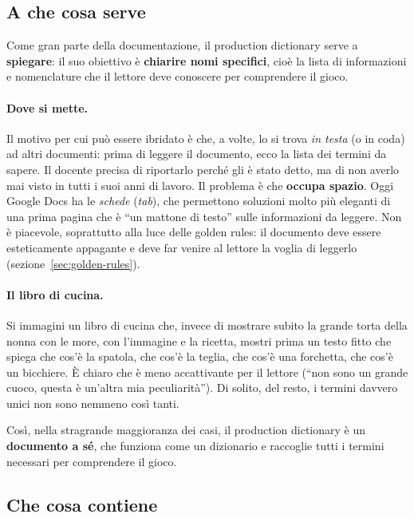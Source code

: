 \subsection{A che cosa serve}

Come gran parte della documentazione, il production dictionary serve a
\textbf{spiegare}: il suo obiettivo è \textbf{chiarire nomi specifici}, cioè
la lista di informazioni e nomenclature che il lettore deve conoscere per
comprendere il gioco.

\paragraph{Dove si mette.} Il motivo per cui può essere ibridato è che, a
volte, lo si trova \emph{in testa} (o in coda) ad altri documenti: prima di
leggere il documento, ecco la lista dei termini da sapere. Il docente precisa
di riportarlo perché gli è stato detto, ma di non averlo mai visto in tutti i
suoi anni di lavoro. Il problema è che \textbf{occupa spazio}. Oggi Google
Docs ha le \emph{schede} (\emph{tab}), che permettono soluzioni molto più
eleganti di una prima pagina che è ``un mattone di testo'' sulle informazioni
da leggere. Non è piacevole, soprattutto alla luce delle golden rules: il
documento deve essere esteticamente appagante e deve far venire al lettore la
voglia di leggerlo (sezione~\ref{sec:golden-rules}).

\paragraph{Il libro di cucina.} Si immagini un libro di cucina che, invece di
mostrare subito la grande torta della nonna con le more, con l'immagine e la
ricetta, mostri prima un testo fitto che spiega che cos'è la spatola, che
cos'è la teglia, che cos'è una forchetta, che cos'è un bicchiere. È chiaro
che è meno accattivante per il lettore (``non sono un grande cuoco, questa è
un'altra mia peculiarità''). Di solito, del resto, i termini davvero unici non
sono nemmeno così tanti.

Così, nella stragrande maggioranza dei casi, il production dictionary è un
\textbf{documento a sé}, che funziona come un dizionario e raccoglie tutti i
termini necessari per comprendere il gioco.

\subsection{Che cosa contiene}

